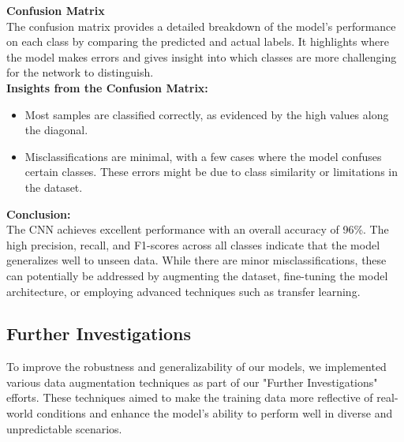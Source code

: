 \documentclass{modeleRapport}
\begin{document}
\textbf{Confusion Matrix}\\

The confusion matrix provides a detailed breakdown of the model's performance on each class by comparing the predicted and 
actual labels. It highlights where the model makes errors and gives insight into which classes are more challenging for the 
network to distinguish.\\

\textbf{Insights from the Confusion Matrix:}\\
\begin{itemize}
    \item Most samples are classified correctly, as evidenced by the high values along the diagonal.
    \item Misclassifications are minimal, with a few cases where the model confuses certain classes. 
    These errors might be due to class similarity or limitations in the dataset.\\
\end{itemize}

\textbf{Conclusion:}\\

The CNN achieves excellent performance with an overall accuracy of 96\%. The high precision, recall, 
and F1-scores across all classes indicate that the model generalizes well to unseen data. While there are minor 
misclassifications, these can potentially be addressed by augmenting the dataset, fine-tuning the model architecture, 
or employing advanced techniques such as transfer learning.

\newpage

\subsection{Further Investigations}

To improve the robustness and generalizability of our models, we implemented various data augmentation techniques as 
part of our "Further Investigations" efforts. These techniques aimed to make the training data more reflective of 
real-world conditions and enhance the model's ability to perform well in diverse and unpredictable scenarios.\\
\end{document}
